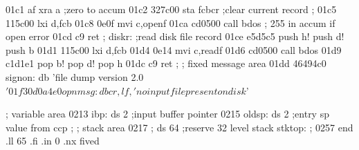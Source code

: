 01c1 af                              xra  a         ;zero to accum
01c2 327c00                          sta  fcbcr     ;clear current record
                            ;
01c5 115c00                          lxi  d,fcb
01c8 0e0f                            mvi  c,openf
01ca cd0500                          call bdos
                            ;        255 in accum if open error
01cd c9                              ret
                            ;
                            diskr:   ;read disk file record
01ce e5d5c5                          push h! push d! push b
01d1 115c00                          lxi  d,fcb
01d4 0e14                            mvi  c,readf
01d6 cd0500                          call bdos
01d9 c1d1e1                          pop b! pop d! pop h
01dc c9                              ret
                            ;
                            ;        fixed message area
01dd 46494c0                signon:  db   'file dump version 2.0$'
01f3 0d0a4e0                opnmsg:  db   cr,lf,'no  input file present on
                                          disk$'

                            ;        variable area
0213                        ibp:     ds   2         ;input buffer pointer
0215                        oldsp:   ds   2         ;entry sp value from ccp
                            ;
                            ;        stack area
0217                        ;        ds   64        ;reserve 32 level stack
                            stktop:
                            ;
0257                                 end
.ll 65
.fi
.in 0
.nx fived
